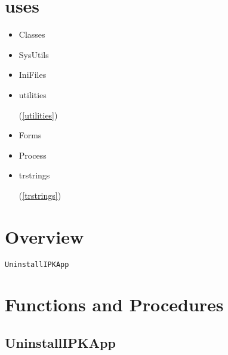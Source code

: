 \documentclass{report}
\newif\ifpdf
\begin{document}
\section{uses}
\begin{itemize}
\item \begin{ttfamily}Classes\end{ttfamily}\item \begin{ttfamily}SysUtils\end{ttfamily}\item \begin{ttfamily}IniFiles\end{ttfamily}\item \begin{ttfamily}utilities\end{ttfamily}(\ref{utilities})\item \begin{ttfamily}Forms\end{ttfamily}\item \begin{ttfamily}Process\end{ttfamily}\item \begin{ttfamily}trstrings\end{ttfamily}(\ref{trstrings})\end{itemize}
\section{Overview}
\begin{description}
\item[\texttt{UninstallIPKApp}]
\end{description}
\section{Functions and Procedures}
\ifpdf
\subsection*{\large{\textbf{UninstallIPKApp}}\normalsize\hspace{1ex}\hrulefill}
\else
\end{document}

